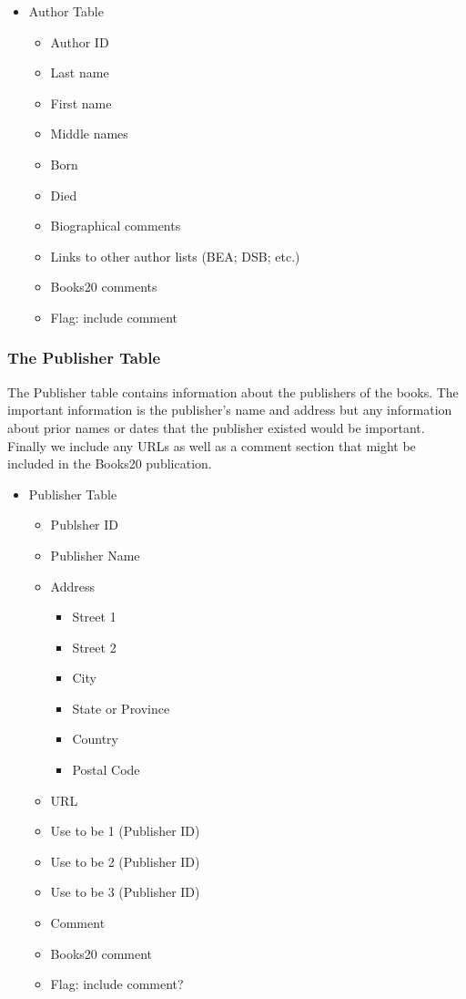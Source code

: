 \documentclass{article}
\begin{document}
\begin{itemize}
\item Author Table
  \begin{itemize}
  \item Author ID
  \item Last name
  \item First name
  \item Middle names
  \item Born
  \item Died
  \item Biographical comments
  \item Links to other author lists (BEA; DSB; etc.)
  \item Books20 comments
  \item Flag: include comment
  \end{itemize}
\end{itemize}

\subsubsection{The Publisher Table}

The Publisher table contains information about the publishers of the
books.  The important information is the publisher's name and address
but any information about prior names or dates that the publisher
existed would be important. Finally we include any URLs as well as a
comment section that might be included in the Books20 publication.\

\begin{itemize}
\item Publisher Table
  \begin{itemize}
  \item Publsher ID
  \item Publisher Name
  \item Address
    \begin{itemize}
    \item Street 1
    \item Street 2
    \item City
    \item State or Province
    \item Country
    \item Postal Code
    \end{itemize}
  \item URL
  \item Use to be 1 (Publisher ID)
  \item Use to be 2 (Publisher ID)
  \item Use to be 3 (Publisher ID)
  \item Comment
  \item Books20 comment
  \item Flag: include comment?
  \end{itemize}
\end{itemize}
\end{document}
